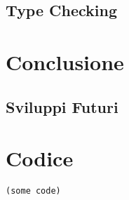 \documentclass{book}
\begin{document}






\section{Type Checking}

\chapter{Conclusione}
\section{Sviluppi Futuri}

\appendix

\chapter{Codice}

\begin{lstlisting}
(some code)
\end{lstlisting}

\printbibliography[nottype=misc,title={Bibliografia}]
\printbibliography[type=misc,title={Sitografia}]
\end{document}
